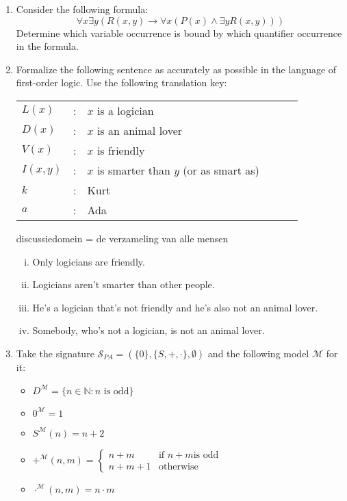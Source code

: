 \begin{enumerate}[\thesection.1]
  
  \item Consider the following formula: \[\forall x\exists
      y(R(x,y)\to \forall x(P(x)\land \exists yR(x,y)))\] Determine
    which variable occurrence is bound by which quantifier occurrence
    in the formula.

    \item Formalize the following sentence as accurately as possible in the language of first-order logic. Use the following translation key:

		\begin{tabular}{l c l l c l}

		$L(x)$ & : & $x$ is a logician \\
		
		$D(x)$ & : & $x$ is an animal lover \\

		$V(x)$ & : & $x$ is friendly \\ $I(x,y)$ & : & $x$ is smarter than $y$ (or as smart as)\\ 

		$k$ & : & Kurt \\ $a$ & : & Ada\\

		\end{tabular}
		
		discussiedomein = de verzameling van alle mensen

		\begin{enumerate}[(i)]

			\item Only logicians are friendly.
			
			\item Logicians aren't smarter than other people.

			\item He's a logician that's not friendly and he's also not an animal lover.
			\item Somebody, who's not a logician, is not an animal lover.

		\end{enumerate}

  \item Take the signature $\mathcal{S}_{PA}=(\{0\},
    \{S,+,\cdot\},\emptyset)$ and the following model $\mathcal{M}$ for it:
    \begin{itemize}
    \item $D^\mathcal{M}=\{n\in\mathbb{N}:n\text{ is odd}\}$
    \item $0^\mathcal{M}=1$
    \item $S^\mathcal{M}(n)=n+2$
    \item $+^\mathcal{M}(n,m)=\begin{cases} n+m & \text{if }
        n+m\text{is odd}\\ n+m+1&\text{otherwise}\end{cases}$
      \item $\cdot^\mathcal{M}(n,m)=n\cdot m$
      

\end{itemize}
\end{enumerate}
